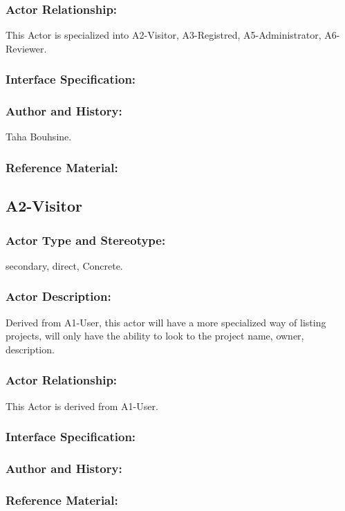 \documentclass[11pt, openany]{report}
\begin{document}
\subsubsection{Actor Relationship:}
This Actor is specialized into A2-Visitor, A3-Registred, A5-Administrator, A6-Reviewer.

\subsubsection{Interface Specification:}
\subsubsection{Author and History:}
Taha Bouhsine.
\subsubsection{Reference Material:}

\clearpage

\subsection{A2-Visitor}
\label{A2}
\subsubsection{Actor Type and Stereotype:}
secondary, direct, Concrete.
\subsubsection{Actor Description:}
Derived from A1-User, this actor will have a more specialized way of listing projects, will only have the ability to look to the project name, owner, description.
\subsubsection{Actor Relationship:}
This Actor is derived from A1-User.
\subsubsection{Interface Specification:}
\subsubsection{Author and History:}
\subsubsection{Reference Material:}
\end{document}

